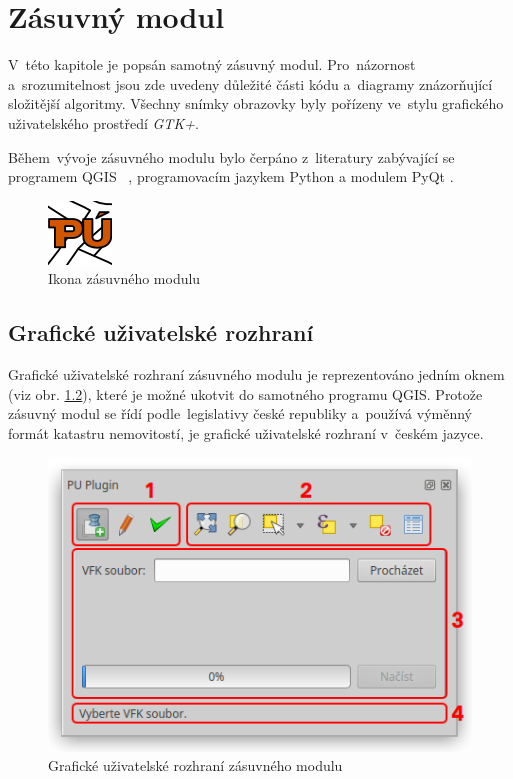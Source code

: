 \chapter{Zásuvný modul}
\label{4-plugin}

V~této kapitole je popsán samotný zásuvný modul. Pro~názornost a~srozumitelnost jsou zde uvedeny důležité části kódu a~diagramy znázorňující složitější algoritmy. Všechny snímky obrazovky byly pořízeny ve~stylu grafického uživatelského prostředí \textit{GTK+}.

Během~vývoje zásuvného modulu bylo čerpáno z~literatury zabývající se programem QGIS \citep{pyqgis_book}~\citep{qgis_book}, programovacím jazykem Python \citep{dive_into_python} \citep{python3_oop_book} a modulem PyQt \citep{pyqt_book}.

	\begin{figure}[H]
		\centering
		\includegraphics[width=.1\textwidth]{./pictures/puplugin.png}
		\caption[Ikona zásuvného modulu]{Ikona zásuvného modulu}
		\label{fig:ikona_pluginu}
 	\end{figure}

\section{Grafické uživatelské rozhraní}
\label{gui}

Grafické uživatelské rozhraní zásuvného modulu je reprezentováno jedním oknem (viz obr. \ref{fig:main_gui}), které je možné ukotvit do samotného programu QGIS. Protože zásuvný modul se řídí podle~legislativy české republiky a~používá výměnný formát katastru nemovitostí, je grafické uživatelské rozhraní v~českém jazyce.

	\begin{figure}[H]
		\centering
		\includegraphics[width=.55\textwidth]{./pictures/main_gui.png}
		\caption[Grafické uživatelské rozhraní zásuvného modulu]{Grafické uživatelské rozhraní zásuvného modulu}
		\label{fig:main_gui}
 	\end{figure}

